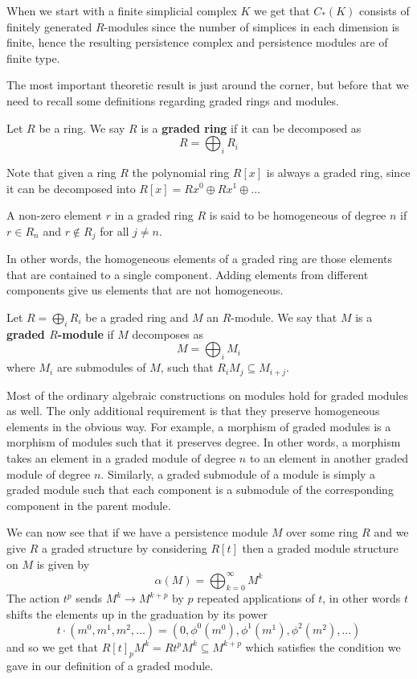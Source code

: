 When we start with a finite simplicial complex $K$ we get that $C_{*}(K)$ consists of finitely generated $R$-modules since the number of simplices in each dimension is finite, hence the resulting persistence complex and persistence modules are of finite type.

The most important theoretic result is just around the corner, but before that we need to recall some definitions regarding graded rings and modules.

\begin{definition}
  Let $R$ be a ring. We say $R$ is a \textbf{graded ring} if it can be decomposed as
  \[ R = \bigoplus_{i} R_{i}\]
\end{definition}
Note that given a ring $R$ the polynomial ring $R[x]$ is always a graded ring, since it can be decomposed into $R[x] = Rx^{0} \oplus Rx^{1} \oplus \dots$

\begin{definition}
A non-zero element $r$ in a graded ring $R$ is said to be homogeneous of degree $n$ if $r \in R_{n}$ and $r \not \in R_{j}$ for all $j \neq n$.
\end{definition}

In other words, the homogeneous elements of a graded ring are those elements that are contained to a single component. Adding elements from different components give us elements that are not homogeneous.
\begin{definition}
  Let $R = \bigoplus_{{i}} R_{i}$ be a graded ring and $M$ an $R$-module. We say that $M$ is a \textbf{graded $R$-module} if $M$ decomposes as
  \[M = \bigoplus_{i} M_{i} \]
  where $M_{i}$ are submodules of $M$, such that $R_{i}M_{j} \subseteq M_{i+j}$.
\end{definition}

Most of the ordinary algebraic constructions on modules hold for graded modules as well. The only additional requirement is that they preserve homogeneous elements in the obvious way. For example, a morphism of graded modules is a morphism of modules such that it preserves degree. In other words, a morphism takes an element in a graded module of degree $n$ to an element in another graded module of degree $n$. Similarly, a graded submodule of a module is simply a graded module such that each component is a submodule of the corresponding component in the parent module.

We can now see that if we have a persistence module $M$ over some ring $R$ and we give $R$ a graded structure by considering $R[t]$ then a graded module structure on $M$ is given by
\[ \alpha(M) = \bigoplus^{\infty}_{k=0} M^{k}\]
The action $t^{p}$ sends $M^{k} \to M^{k+p}$ by $p$ repeated applications of $t$, in other words $t$ shifts the elements up in the graduation by its power
\[ t \cdot (m^{0}, m^{1}, m^{2}, \dots  ) = (0, \phi^{0}(m^{0}), \phi^{1}(m^{1}),\phi^{2}(m^{2}),\dots) \]
and so we get that $R[t]_{p}M^{k} = Rt^{p}M^{k} \subseteq M^{k+p}$ which satisfies the condition we gave in our definition of a graded module.

